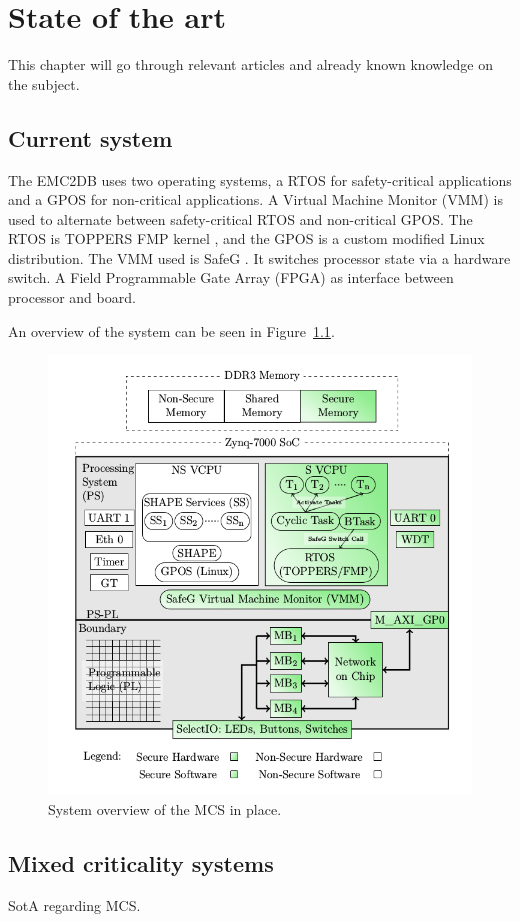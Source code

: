 \chapter{State of the art}
This chapter will go through relevant articles and already known knowledge on the subject.

\section{Current system}
The EMC2DB uses two operating systems, a RTOS for safety-critical applications and a GPOS for non-critical applications. A Virtual Machine Monitor (VMM) is used to alternate between safety-critical RTOS and non-critical GPOS. The RTOS is TOPPERS FMP kernel \cite{website:FMP}, and the GPOS is a custom modified Linux distribution. The VMM used is SafeG \cite{website:safeg}. It switches processor state via a hardware switch. A Field Programmable Gate Array (FPGA) as interface between processor and board. %

An overview of the system can be seen in Figure~\ref{fig:introduction_overview}.

\begin{figure}[H]
\centering
\includegraphics[width=\textwidth]{./img/introduction_overview.png}
\caption{System overview of the MCS in place.\cite{zaki2016}}\label{fig:introduction_overview}
\end{figure}

\section{Mixed criticality systems}
SotA regarding MCS.
